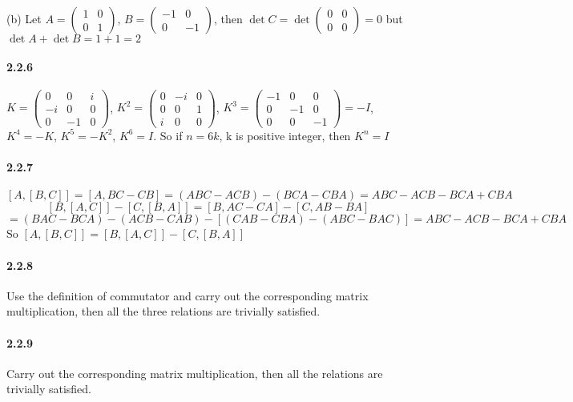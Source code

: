 \documentclass[a4paper]{article}
\begin{document}
(b)
Let $A=\begin{pmatrix}
1&0\\0&1
\end{pmatrix}$, $B=\begin{pmatrix}
-1&0\\0&-1
\end{pmatrix}$, then $\det{C}=\det\begin{pmatrix}
0&0\\0&0
\end{pmatrix}=0$ but $\det{A}+\det{B}=1+1=2$

\paragraph{2.2.6}
$K=
\begin{pmatrix}
0&0&i\\
-i&0&0\\
0&-1&0
\end{pmatrix}
$, 
$K^2=
\begin{pmatrix}
0&-i&0\\
0&0&1\\
i&0&0
\end{pmatrix}
$, 
$K^3=
\begin{pmatrix}
-1&0&0\\
0&-1&0\\
0&0&-1
\end{pmatrix}=-I
$, 
$K^4=-K$, $K^5=-K^2$, $K^6=I$. So if $n=6k$, k is positive integer, then $K^n=I$

\paragraph{2.2.7}
\[[A,[B,C]]=[A,BC-CB]=(ABC-ACB)-(BCA-CBA)=ABC-ACB-BCA+CBA\]
\[[B,[A,C]]-[C,[B,A]]=[B,AC-CA]-[C,AB-BA]\]
\[=(BAC-BCA)-(ACB-CAB)-[(CAB-CBA)-(ABC-BAC)]=ABC-ACB-BCA+CBA\]
So $[A,[B,C]]=[B,[A,C]]-[C,[B,A]]$

\paragraph{2.2.8}
Use the definition of commutator and carry out the corresponding matrix multiplication, then all the three relations are trivially satisfied.

\paragraph{2.2.9}
Carry out the corresponding matrix multiplication, then all the relations are trivially satisfied.
\end{document}
